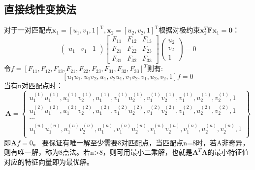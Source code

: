 \subsection{直接线性变换法}
对于一对匹配点$\boldsymbol{x}_{1}=\left[ u_{1},v_{1},1\right]^{\mathrm{T}}, \boldsymbol{x}_{2}=\left[ u_{2},v_{2},1\right]^{\mathrm{T}}$根据对极约束$\boldsymbol{x}_{2}^{T} \boldsymbol{F x}_{1}=\mathbf{0}$：
\begin{equation}
\left( \begin{array}{ccc}{u_{1}} & {v_{1}} & {1}\end{array}\right) \left[ \begin{array}{ccc}{F_{11}} & {F_{12}} & {F_{13}} \\ {F_{21}} & {F_{22}} & {F_{23}} \\ {F_{31}} & {F_{32}} & {F_{33}}\end{array}\right] \left( \begin{array}{l}{u_{2}} \\ {v_{2}} \\ {1}\end{array}\right)=0
\end{equation}
令$f=\left[ F_{11},F_{12},F_{13},F_{21},F_{22},F_{23},F_{31},F_{32},F_{33} \right]^{T}$则有:
\begin{equation}
\left[
{u_{1} u_{1},}{u_{1} v_{2},}{u_{1},}{v_{2} u_{1},}{v_{1} v_{2},}{v_{1},}{u_{2},}{v_{2},}{1}
\right] f=0
\end{equation}
当有n对匹配点时：
\begin{equation}
\boldsymbol{A}=
\left\lbrace
	\begin{array}{c}
	u_{1}^{(1)} u_{1}^{(1)}, u_{1}^{(1)} v_{2}^{(1)}, u_{1}^{(1)},  v_{1}^{(1)} u_{2}^{(1)}, v_{1}^{(1)} v_{2}^{(1)}, v_{1}^{(1)}, u_{2}^{(1)}, v_{2}^{(1)},1\\
	u_{1}^{(2)} u_{1}^{(2)}, u_{1}^{(2)} v_{2}^{(2)}, u_{1}^{(2)},  v_{1}^{(2)} u_{2}^{(2)}, v_{1}^{(2)} v_{2}^{(2)}, v_{1}^{(2)}, u_{2}^{(2)}, v_{2}^{(2)},1\\
	\cdots\\
	u_{1}^{(n)} u_{1}^{(n)}, u_{1}^{(n)} v_{2}^{(n)}, u_{1}^{(n)},  v_{1}^{(n)} u_{2}^{(n)}, v_{1}^{(n)} v_{2}^{(n)}, v_{1}^{(n)}, u_{2}^{(n)}, v_{2}^{(n)},1\\
	\end{array}
\right\rbrace 
\end{equation}
即$\boldsymbol{A}f=0$。
要保证有唯一解至少需要8对匹配点，当匹配点n=8时，若A非奇异，则有唯一解，称为8点法\cite{longuet1981computer}。若n>8，则可用最小二乘解，也就是$\boldsymbol{A}^T\boldsymbol{A}$的最小特征值对应的特征向量即为最优解。

